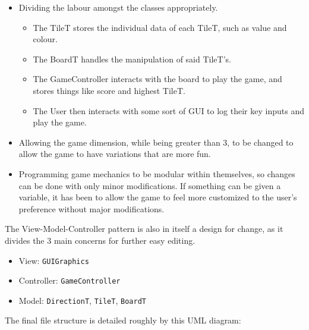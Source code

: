 \documentclass[12pt]{article}
\begin{document}
\begin{itemize}
  \item Dividing the labour amongst the classes appropriately.
        \begin{itemize}
          \item The TileT stores the individual data of each TileT, such as value and colour.
          \item The BoardT handles the manipulation of said TileT's.
          \item The GameController interacts with the board to play the game, and stores things like score and highest TileT.
          \item The User then interacts with some sort of GUI to log their key inputs and play the game.
        \end{itemize}
  \item Allowing the game dimension, while being greater than 3, to be changed to allow the game to have variations that are more fun.
  \item Programming game mechanics to be modular within themselves, so changes can be done with only minor modifications. If something can be given a variable, it has been to allow the game to feel more customized to the user's preference without major modifications.
\end{itemize}

The View-Model-Controller pattern is also in itself a design for change, as it divides the 3 main concerns for further easy editing.

\begin{itemize}
  \item View: \texttt{GUIGraphics}
  \item Controller: \texttt{GameController}
  \item Model: \texttt{DirectionT}, \texttt{TileT}, \texttt{BoardT}
\end{itemize}

The final file structure is detailed roughly by this UML diagram:
\end{document}
